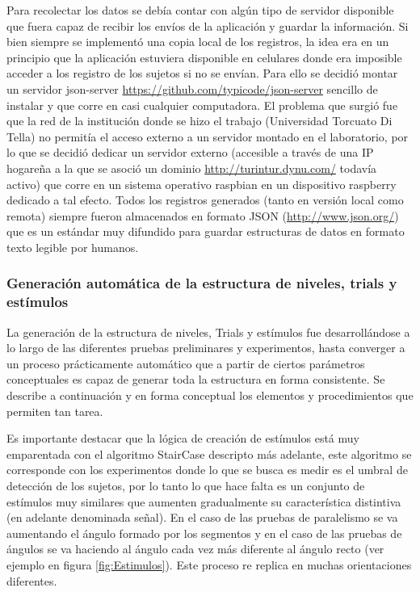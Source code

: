 \documentclass{article}
\numberwithin{figure}{section}
\begin{document}
    Para recolectar los datos se debía contar con algún tipo de servidor disponible que fuera capaz de recibir los envíos de la aplicación y guardar la información. Si bien siempre se implementó una copia local de los registros, la idea era en un principio que la aplicación estuviera disponible en celulares donde era imposible acceder a los registro de los sujetos si no se envían. Para ello se decidió montar un servidor json-server \url{https://github.com/typicode/json-server} sencillo de instalar y que corre en casi cualquier computadora. El problema que surgió fue que la red de la institución donde se hizo el trabajo (Universidad Torcuato Di Tella) no permitía el acceso externo a un servidor montado en el laboratorio, por lo que se decidió dedicar un servidor externo (accesible a través de una IP hogareña a la que se asoció un dominio \url{http://turintur.dynu.com/} todavía activo) que corre en un sistema operativo raspbian en un dispositivo raspberry dedicado a tal efecto. Todos los registros generados (tanto en versión local como remota) siempre fueron almacenados en formato JSON (\url{http://www.json.org/}) que es un estándar muy difundido para guardar estructuras de datos en formato texto legible por humanos. 
    
    \subsubsection{Generación automática de la estructura de niveles, trials y estímulos} \label{seccion:builder}
    
    La generación de la estructura de niveles, Trials y estímulos fue desarrollándose a lo largo de las diferentes pruebas preliminares y experimentos, hasta converger a un proceso prácticamente automático que a partir de ciertos parámetros conceptuales es capaz de generar toda la estructura en forma consistente. Se describe a continuación y en forma conceptual los elementos y procedimientos que permiten tan tarea. 
    
    Es importante destacar que la lógica de creación de estímulos está muy emparentada con el algoritmo StairCase descripto más adelante, este algoritmo se corresponde con los experimentos donde lo que se busca es medir es el umbral de detección de los sujetos, por lo tanto lo que hace falta es un conjunto de estímulos muy similares que aumenten gradualmente su característica distintiva (en adelante denominada señal). En el caso de las pruebas de paralelismo se va aumentando el ángulo formado por los segmentos y en el caso de las pruebas de ángulos se va haciendo al ángulo cada vez más diferente al ángulo recto (ver ejemplo en figura \ref{fig:Estimulos}). Este proceso re replica en muchas orientaciones diferentes.
    
\end{document}
